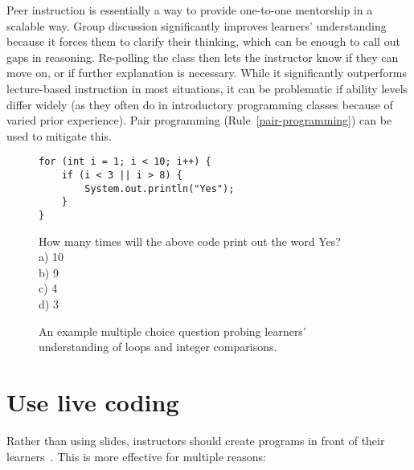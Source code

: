 \documentclass{article}
\begin{document}
Peer instruction is essentially
a way to provide one-to-one mentorship in a scalable way.
Group discussion significantly improves learners' understanding
because it forces them to clarify their thinking,
which can be enough to call out gaps in reasoning.
Re-polling the class then lets the instructor know if they can move on,
or if further explanation is necessary.
While it significantly outperforms lecture-based instruction in most situations,
it can be problematic if ability levels differ widely
(as they often do in introductory programming classes
because of varied prior experience).
Pair programming (Rule~\ref{pair-programming}) can be used to mitigate this.

\begin{figure}
\begin{verbatim}
for (int i = 1; i < 10; i++) {
    if (i < 3 || i > 8) {
        System.out.println("Yes");
    }
}
\end{verbatim}
How many times will the above code print out the word Yes?\\
a) 10\\
b) 9\\
c) 4\\
d) 3
\label{fig:mcq}
\caption{An example multiple choice question probing learners' understanding of loops and integer comparisons.}
\end{figure}

\section{Use live coding}\label{live-coding}

Rather than using slides,
instructors should create programs in front of their learners~\citep{rubin-live-coding}.
This is more effective for multiple reasons:
\end{document}

